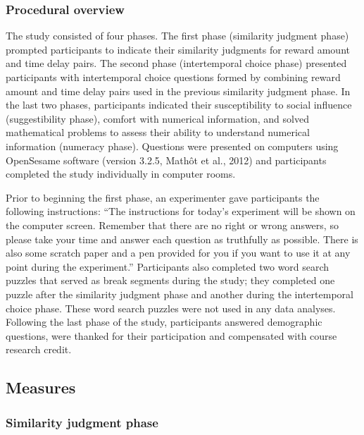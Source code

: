 \documentclass[
  pub,floatsintext]{apa6}
\begin{document}
\hypertarget{procedural-overview}{%
\subsubsection{Procedural overview}\label{procedural-overview}}

The study consisted of four phases. The first phase (similarity judgment phase) prompted participants to indicate their similarity judgments for reward amount and time delay pairs. The second phase (intertemporal choice phase) presented participants with intertemporal choice questions formed by combining reward amount and time delay pairs used in the previous similarity judgment phase. In the last two phases, participants indicated their susceptibility to social influence (suggestibility phase), comfort with numerical information, and solved mathematical problems to assess their ability to understand numerical information (numeracy phase). Questions were presented on computers using OpenSesame software (version 3.2.5, Mathôt et al., 2012) and participants completed the study individually in computer rooms.

Prior to beginning the first phase, an experimenter gave participants the following instructions: ``The instructions for today's experiment will be shown on the computer screen. Remember that there are no right or wrong answers, so please take your time and answer each question as truthfully as possible. There is also some scratch paper and a pen provided for you if you want to use it at any point during the experiment.'' Participants also completed two word search puzzles that served as break segments during the study; they completed one puzzle after the similarity judgment phase and another during the intertemporal choice phase. These word search puzzles were not used in any data analyses. Following the last phase of the study, participants answered demographic questions, were thanked for their participation and compensated with course research credit.

\hypertarget{measures}{%
\subsection{Measures}\label{measures}}

\hypertarget{similarity-judgment-phase}{%
\subsubsection{Similarity judgment phase}\label{similarity-judgment-phase}}
\end{document}
